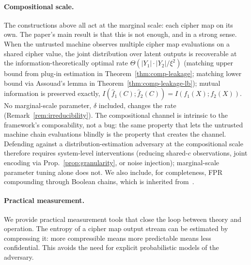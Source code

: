\documentclass[11pt]{article}
\theoremstyle{definition}
\theoremstyle{plain}
\theoremstyle{remark}
\newcommand{\fhat}{\hat{f}}
\begin{document}
\paragraph{Compositional scale.}
The constructions above all act at the marginal scale: each cipher map
on its own.  The paper's main result is that this is not enough, and
in a strong sense.  When the untrusted machine observes multiple
cipher map evaluations on a shared cipher value, the joint
distribution over latent outputs is recoverable at the
information-theoretically optimal rate $\Theta(|Y_1|\cdot|Y_2|/\xi^2)$
(matching upper bound from plug-in estimation in
Theorem~\ref{thm:comp-leakage}; matching lower bound via Assouad's
lemma in Theorem~\ref{thm:comp-leakage-lb}); mutual
information is preserved exactly,
$I(\fhat_1(C); \fhat_2(C)) = I(f_1(X); f_2(X))$.  No marginal-scale
parameter, $\delta$ included, changes the rate (Remark~\ref{rem:irreducibility}).
The compositional channel is intrinsic to the framework's
composability, not a bug: the same property that lets the untrusted
machine chain evaluations blindly is the property that creates the
channel.  Defending against a distribution-estimation adversary at
the compositional scale therefore requires system-level interventions
(reducing shared-$c$ observations, joint encoding via
Prop.~\ref{prop:granularity}, or noise injection); marginal-scale
parameter tuning alone does not.  We also include, for completeness,
FPR compounding through Boolean chains, which is inherited
from~\cite[Sec.~7.4]{towell2026cipher}.

\paragraph{Practical measurement.}
We provide practical measurement tools that close the loop between
theory and operation.  The entropy of a cipher map output stream can
be estimated by compressing it: more compressible means more
predictable means less confidential.  This avoids the need for
explicit probabilistic models of the adversary.
\end{document}
